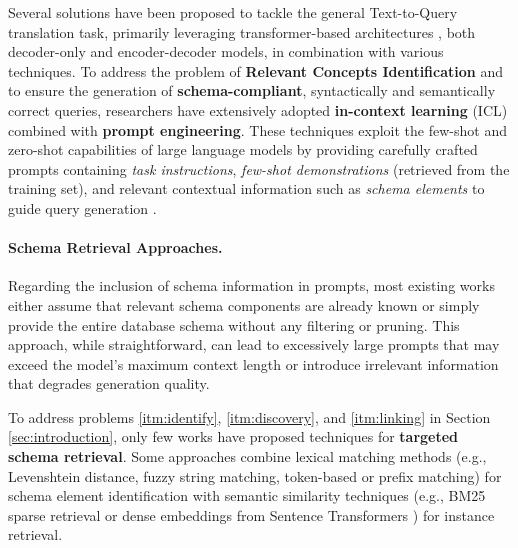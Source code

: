 Several solutions have been proposed to tackle the general Text-to-Query translation task, primarily leveraging transformer-based architectures \cite{vaswani-etal-2017-attention}, both decoder-only and encoder-decoder models, in combination with various techniques. %
%
To address the problem of \textbf{Relevant Concepts Identification} and to ensure the generation of \textbf{schema-compliant}, syntactically and semantically correct queries, researchers have extensively adopted \textbf{in-context learning} (ICL) combined with \textbf{prompt engineering}. These techniques exploit the few-shot and zero-shot capabilities of large language models by providing carefully crafted prompts containing \textit{task instructions}, \textit{few-shot demonstrations} (retrieved from the training set), and relevant contextual information such as \textit{schema elements} to guide query generation \cite{neo4jlabs-text2cypher-2024, longwell-etal-2024-triple-augmented, yang-etal-2026-enhancing, cypherbench-megagonlabs-2024, dabramo-etal-2025-investigating}.

\paragraph{Schema Retrieval Approaches.}
Regarding the inclusion of schema information in prompts, most existing works \cite{neo4jlabs-text2cypher-2024, cypherbench-megagonlabs-2024, longwell-etal-2024-triple-augmented, dabramo-etal-2025-investigating} either assume that relevant schema components are already known or simply provide the entire database schema without any filtering or pruning. This approach, while straightforward, can lead to excessively large prompts that may exceed the model's maximum context length or introduce irrelevant information that degrades generation quality.

To address problems \ref{itm:identify}, \ref{itm:discovery}, and \ref{itm:linking} in Section \ref{sec:introduction}, only few works have proposed techniques for \textbf{targeted schema retrieval}. Some approaches \cite{yang-etal-2026-enhancing, grasp-walter-bast-2025, grasp-entity-linking-2025} combine lexical matching methods (e.g., Levenshtein distance, fuzzy string matching, token-based or prefix matching) for schema element identification with semantic similarity techniques (e.g., BM25 sparse retrieval or dense embeddings from Sentence Transformers \cite{reimers-2019-sentence-bert}) for instance retrieval.

